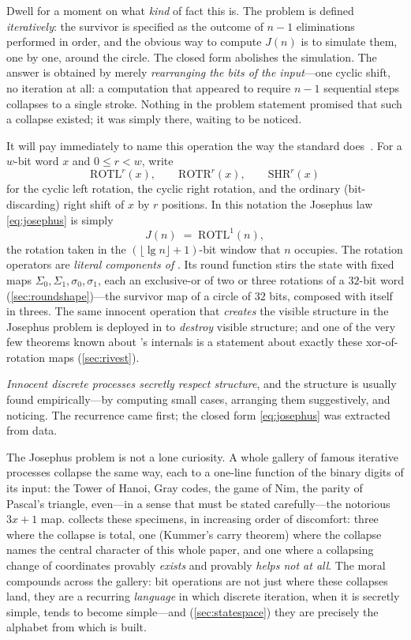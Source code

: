 Dwell for a moment on what \emph{kind} of fact this is. The problem is
defined \emph{iteratively}: the survivor is specified as the outcome of
$n-1$ eliminations performed in order, and the obvious way to compute
$J(n)$ is to simulate them, one by one, around the circle. The closed
form abolishes the simulation. The answer is obtained by merely
\emph{rearranging the bits of the input}---one cyclic shift, no iteration
at all: a computation that appeared to require $n-1$ sequential steps
collapses to a single stroke. Nothing in the problem statement promised
that such a collapse existed; it was simply there, waiting to be noticed.

It will pay immediately to name this operation the way the \SHA{}
standard does~\citep{FIPS180-4}. For a $w$-bit word $x$ and $0 \le r < w$,
write
\[
  \mathrm{ROTL}^{r}(x), \qquad \mathrm{ROTR}^{r}(x), \qquad \mathrm{SHR}^{r}(x)
\]
for the cyclic left rotation, the cyclic right rotation, and the ordinary
(bit-discarding) right shift of $x$ by $r$ positions. In this notation the
Josephus law \cref{eq:josephus} is simply
\[
  J(n) \;=\; \mathrm{ROTL}^{1}(n),
\]
the rotation taken in the $(\lfloor \lg n \rfloor + 1)$-bit window
that $n$ occupies. The rotation operators are \emph{literal components
of \SHA{}}. Its round function stirs the state with fixed maps
$\Sigma_0, \Sigma_1, \sigma_0, \sigma_1$, each an exclusive-or of two
or three rotations of a $32$-bit word (\cref{sec:roundshape})---the
survivor map of a circle of $32$ bits, composed with itself in
threes. The same innocent operation that \emph{creates} the visible
structure in the Josephus problem is deployed in \SHA{} to
\emph{destroy} visible structure; and one of the very few theorems
known about \SHA{}'s internals is a statement about exactly these
xor-of-rotation maps (\cref{sec:rivest}).

\emph{Innocent discrete processes secretly respect structure}, and the
structure is usually found empirically---by computing small cases,
arranging them suggestively, and noticing. The recurrence came first; the
closed form \cref{eq:josephus} was extracted from data.

The Josephus problem is not a lone curiosity. A whole gallery of famous
iterative processes collapse the same way, each to a one-line function
of the binary digits of its input: the Tower of Hanoi, Gray codes, the
game of Nim, the parity of Pascal's triangle, even---in a sense that
must be stated carefully---the notorious $3x+1$ map.
 collects these specimens, in increasing order of
discomfort: three where the collapse is total, one (Kummer's carry
theorem) where the collapse names the central character of this whole
paper, and one where a collapsing change of coordinates provably
\emph{exists} and provably \emph{helps not at all}. The moral compounds
across the gallery: bit operations are not just where these collapses
land, they are a recurring \emph{language} in which discrete iteration,
when it is secretly simple, tends to become simple---and
(\cref{sec:statespace}) they are precisely the alphabet from which
\SHA{} is built.

